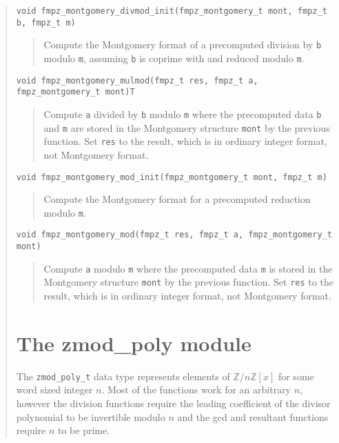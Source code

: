 \documentclass[a4paper,10pt]{article}
\newcommand{\Z}{\mathbb{Z}}
\newcommand{\code}{\lstinline}
\begin{document}
\begin{quote}
\begin{lstlisting}
void fmpz_montgomery_divmod_init(fmpz_montgomery_t mont, fmpz_t b, fmpz_t m) 
\end{lstlisting}
\begin{quote}
Compute the Montgomery format of a precomputed division by \code{b} modulo \code{m}, assuming \code{b} is coprime with and reduced modulo \code{m}.
\end{quote}

\begin{lstlisting}
void fmpz_montgomery_mulmod(fmpz_t res, fmpz_t a, fmpz_montgomery_t mont)T
\end{lstlisting}
\begin{quote}
Compute \code{a} divided by \code{b} modulo \code{m} where the precomputed data \code{b} and \code{m} are stored in the Montgomery structure \code{mont} by the previous function. Set \code{res} to the result, which is in ordinary integer format, not Montgomery format.
\end{quote}

\begin{lstlisting}
void fmpz_montgomery_mod_init(fmpz_montgomery_t mont, fmpz_t m) 
\end{lstlisting}
\begin{quote}
Compute the Montgomery format for a precomputed reduction modulo \code{m}.
\end{quote}

\begin{lstlisting}
void fmpz_montgomery_mod(fmpz_t res, fmpz_t a, fmpz_montgomery_t mont)
\end{lstlisting}
\begin{quote}
Compute \code{a} modulo \code{m} where the precomputed data \code{m} is stored in the Montgomery structure \code{mont} by the previous function. Set \code{res} to the result, which is in ordinary integer format, not Montgomery format.
\end{quote}

\section{The zmod\_poly module}

The \code{zmod_poly_t} data type represents elements of $\Z/n\Z[x]$ for some word sized integer $n$. Most of the functions work for an arbitrary $n$, however the division functions require the leading coefficient of the divisor polynomial to be invertible modulo $n$ and the gcd and resultant functions require $n$ to be prime.


\end{quote}
\end{document}
